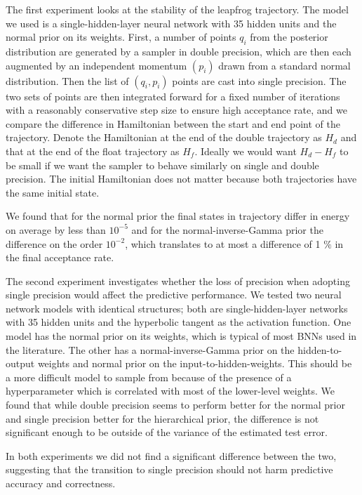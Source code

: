 \documentclass[12pt]{report}
\begin{document}
The first experiment looks at the stability of the leapfrog trajectory. The model we used is a single-hidden-layer neural network with 35 hidden units and the normal prior on its weights. First, a number of points ${q_i}$ from the posterior distribution are generated by a sampler in double precision, which are then each augmented by an independent momentum $(p_i)$ drawn from a standard normal distribution. Then the list of $(q_i,p_i)$ points are cast into single precision. The two sets of points are then integrated forward for a fixed number of iterations with a reasonably conservative step size to ensure high acceptance rate, and we compare the difference in Hamiltonian between the start and end point of the trajectory. Denote the Hamiltonian at the end of the double trajectory as $H_d$ and that at the end of the float trajectory as $H_f$. Ideally we would want $H_d-H_f$ to be small if we want the sampler to behave similarly on single and double precision. The initial Hamiltonian does not matter because both trajectories have the same initial state. 

We found that for the normal prior the final states in trajectory differ in energy on average by less than $10^{-5}$ and for the normal-inverse-Gamma prior the difference on the order $10^{-2}$, which translates to at most a difference of 1 $\%$ in the final acceptance rate.


The second experiment investigates whether the loss of precision when adopting single precision would affect the predictive performance. We tested two neural network models with identical structures; both are single-hidden-layer networks with 35 hidden units and the hyperbolic tangent as the activation function. One model has the normal prior on its weights, which is typical of most BNNs used in the literature. The other has a normal-inverse-Gamma prior on the hidden-to-output weights and normal prior on the input-to-hidden-weights. This should be a more difficult model to sample from because of the presence of a hyperparameter which is correlated with most of the lower-level weights. We found that while double precision seems to perform better for the normal prior and single precision better for the hierarchical prior, the difference is not significant enough to be outside of the variance of the estimated test error. 

In both experiments we did not find a significant difference between the two, suggesting that the transition to single precision should not harm predictive accuracy and correctness. 
\end{document}
